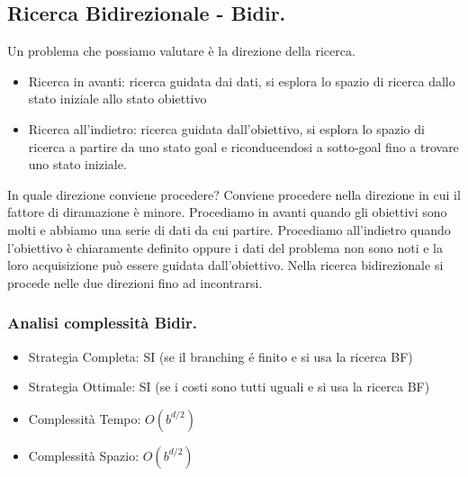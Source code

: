 \documentclass{article}
\begin{document}
\subsection{Ricerca Bidirezionale - Bidir.}
Un problema che possiamo valutare è la direzione della ricerca.
\begin{itemize}
    \item Ricerca in avanti: ricerca guidata dai dati, si esplora lo spazio di ricerca dallo stato iniziale allo stato obiettivo
    \item Ricerca all'indietro: ricerca guidata dall'obiettivo, si esplora lo spazio di ricerca a partire da uno stato goal e riconducendosi a sotto-goal fino a trovare uno stato iniziale.
\end{itemize}
In quale direzione conviene procedere? Conviene procedere nella direzione in cui il fattore di diramazione è minore. Procediamo in avanti quando gli obiettivi sono molti e abbiamo una serie di dati da cui partire. Procediamo all'indietro quando l'obiettivo è chiaramente definito oppure i dati del problema non sono noti e la loro acquisizione può essere guidata dall'obiettivo. \newline
Nella ricerca bidirezionale si procede nelle due direzioni fino ad incontrarsi.
\subsubsection{Analisi complessità Bidir.}
\begin{itemize}
    \item Strategia Completa: SI (se il branching é finito e si usa la ricerca BF)
    \item Strategia Ottimale: SI (se i costi sono tutti uguali e si usa la ricerca BF)
    \item Complessità Tempo: $O(b^{d/2})$
    \item Complessità Spazio: $O(b^{d/2})$
\end{itemize}
\end{document}
